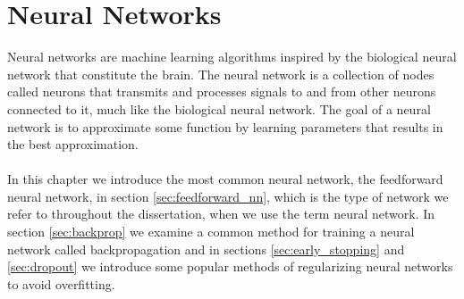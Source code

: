 \chapter{Neural Networks}
Neural networks are machine learning algorithms inspired by the biological neural network that constitute the brain. The neural network is a collection of nodes called neurons that transmits and processes signals to and from other neurons connected to it, much like the biological neural network. The goal of a neural network is to approximate some function by learning parameters that results in the best approximation.
\\
\\
In this chapter we introduce the most common neural network, the feedforward neural network, in section \ref{sec:feedforward_nn}, which is the type of network we refer to throughout the dissertation, when we use the term neural network. In section \ref{sec:backprop} we examine a common method for training a neural network called backpropagation and in sections \ref{sec:early_stopping} and \ref{sec:dropout} we introduce some popular methods of regularizing neural networks to avoid overfitting. 

